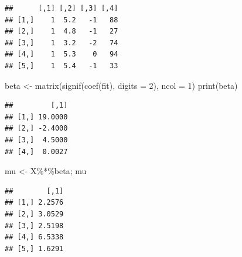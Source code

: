 \documentclass[
]{book}
\newenvironment{Shaded}{\begin{snugshade}}{\end{snugshade}}
\newcommand{\AttributeTok}[1]{\textcolor[rgb]{0.77,0.63,0.00}{#1}}
\newcommand{\DecValTok}[1]{\textcolor[rgb]{0.00,0.00,0.81}{#1}}
\newcommand{\FunctionTok}[1]{\textcolor[rgb]{0.00,0.00,0.00}{#1}}
\newcommand{\NormalTok}[1]{#1}
\newcommand{\OtherTok}[1]{\textcolor[rgb]{0.56,0.35,0.01}{#1}}
\newcommand{\SpecialCharTok}[1]{\textcolor[rgb]{0.00,0.00,0.00}{#1}}
\begin{document}
\begin{Shaded}
\end{Shaded}

\begin{verbatim}
##      [,1] [,2] [,3] [,4]
## [1,]    1  5.2   -1   88
## [2,]    1  4.8   -1   27
## [3,]    1  3.2   -2   74
## [4,]    1  5.3    0   94
## [5,]    1  5.4   -1   33
\end{verbatim}

\begin{Shaded}
\begin{Highlighting}[]
\NormalTok{beta }\OtherTok{\textless{}{-}} \FunctionTok{matrix}\NormalTok{(}\FunctionTok{signif}\NormalTok{(}\FunctionTok{coef}\NormalTok{(fit), }\AttributeTok{digits =} \DecValTok{2}\NormalTok{), }\AttributeTok{ncol =} \DecValTok{1}\NormalTok{)}
\FunctionTok{print}\NormalTok{(beta)}
\end{Highlighting}
\end{Shaded}

\begin{verbatim}
##         [,1]
## [1,] 19.0000
## [2,] -2.4000
## [3,]  4.5000
## [4,]  0.0027
\end{verbatim}

\begin{Shaded}
\begin{Highlighting}[]
\NormalTok{mu }\OtherTok{\textless{}{-}}\NormalTok{ X}\SpecialCharTok{\%*\%}\NormalTok{beta; mu}
\end{Highlighting}
\end{Shaded}

\begin{verbatim}
##        [,1]
## [1,] 2.2576
## [2,] 3.0529
## [3,] 2.5198
## [4,] 6.5338
## [5,] 1.6291
\end{verbatim}

\begin{Shaded}
\end{Shaded}
\end{document}
